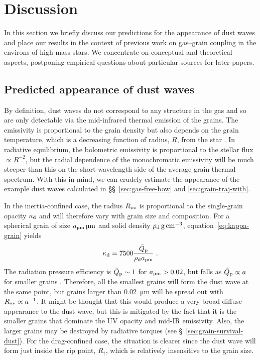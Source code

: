 
\section{Discussion}
\label{sec:discussion}

In this section we briefly discuss our predictions for the
appearance of dust waves and place our results in the context of
previous work on gas--grain coupling in the environs of high-mass
stars.  We concentrate on conceptual and theoretical aspects,
postponing empirical questions about particular sources for later
papers.

\subsection{Predicted appearance of dust waves}
\label{sec:pred-shape-struct}
By definition, dust waves do not correspond to any structure in the
gas and so are only detectable via the mid-infrared thermal emission
of the grains.  The emissivity is proportional to the grain density
but also depends on the grain temperature, which is a decreasing
function of radius, \(R\), from the star \citetext{see, for example,
  synthetic observations in \citealp{Mackey:2016a, Acreman:2016a,
    Meyer:2017a}}.  In radiative equilibrium, the bolometric
emissivity is proportional to the stellar flux \(\propto R^{-2}\), but the
radial dependence of the monochromatic emissivity will be much steeper
than this on the short-wavelength side of the average grain thermal
spectrum.  With this in mind, we can crudely estimate the appearance
of the example dust waves calculated in \S\S~\ref{sec:gas-free-bow}
and \ref{sec:grain-traj-with}.

In the inertia-confined case, the radius \(R\starstar\) is
proportional to the single-grain opacity \(\kappa\grain\) and will
therefore vary with grain size and composition.  For a spherical grain
of size \(\amu\,\si{\um}\) and solid density
\(\rho\grain \, \si{g.cm^{-3}}\), equation~\eqref{eq:kappa-grain} yields
\begin{equation}
  \label{eq:kappa-d-dependence}
  \kappa\grain = 7500 \frac{\Qpbar}{\rho\grain \amu} \ . 
\end{equation}
The radiation pressure efficiency is \(\Qpbar \sim 1\) for
\(\amu > 0.02\), but falls as \(\Qpbar \propto a\) for smaller grains
\citep[e.g., Fig.~7 of][]{Draine:2011a}.  Therefore, all the smallest
grains will form the dust wave at the same point, but grains larger
than \SI{0.02}{\um} will be spread out with
\(R\starstar \propto a^{-1}\).  It might be thought that this would produce
a very broad diffuse appearance to the dust wave, but this is
mitigated by the fact that it is the smaller grains that dominate the
UV opacity and mid-IR emissivity.  Also, the larger grains may be
destroyed by radiative torques (see \S~\ref{sec:grain-survival-dust}).
For the drag-confined case, the situation is clearer since the dust
wave will form just inside the rip point, \(R_\dag\), which is relatively
insensitive to the grain size.

